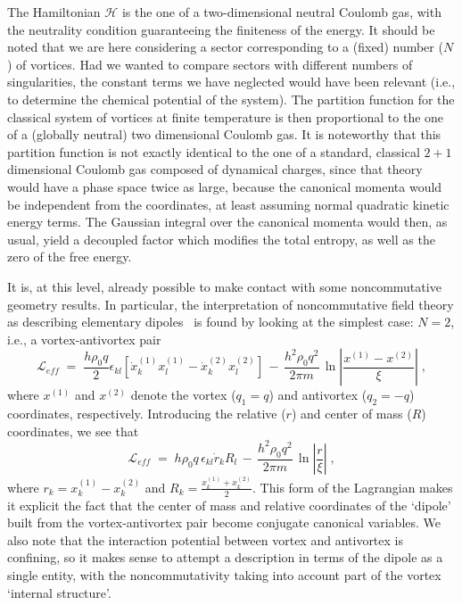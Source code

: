 \documentclass[a4paper,12pt]{article} \tolerance=200
\begin{document}
The Hamiltonian ${\mathcal H}$ is the one of a two-dimensional neutral
Coulomb gas, with the neutrality condition guaranteeing the finiteness
of the energy.  It should be noted that we are here considering a
sector corresponding to a (fixed) number ($N$) of vortices. Had we
wanted to compare sectors with different numbers of singularities, the
constant terms we have neglected would have been relevant (i.e., to
determine the chemical potential of the system). The partition
function for the classical system of vortices at finite temperature is
then proportional to the one of a (globally neutral) two dimensional
Coulomb gas. It is noteworthy that this partition function is not
exactly identical to the one of a standard, classical $2+1$
dimensional Coulomb gas composed of dynamical charges, since that
theory would have a phase space twice as large, because the canonical
momenta would be independent from the coordinates, at least assuming
normal quadratic kinetic energy terms. The Gaussian integral over the
canonical momenta would then, as usual, yield a decoupled factor which
modifies the total entropy, as well as the zero of the free energy.

It is, at this level, already possible to make contact with some
noncommutative geometry results. In particular, the interpretation of
noncommutative field theory as describing elementary dipoles~\cite{BS}
is found by looking at the simplest case: $N=2$, i.e., a 
vortex-antivortex pair
\begin{equation}\label{eq:fq2}
{\mathcal L}_{eff}\;=\; \frac{h \rho_0 q}{2} \epsilon_{kl}
[\dot{x}^{(1)}_k x^{(1)}_l - \dot{x}^{(2)}_k x^{(2)}_l]
\,-\,\frac{h^2\rho_0 q^2}{2\pi m}\, 
\ln | \frac{x^{(1)} - x^{(2)}}{\xi} | \;,
\end{equation}
where $x^{(1)}$ and $x^{(2)}$ denote the vortex ($q_1 = q$) and
antivortex ($q_2=-q$) coordinates, respectively. Introducing the
relative ($r$) and center of mass ($R$) coordinates, we see that
\begin{equation}
{\mathcal L}_{eff}\;=\; h \rho_0 q \, \epsilon_{kl} \dot{r}_k R_l
\,-\,\frac{h^2\rho_0 q^2}{2\pi m}\, \ln |\frac{r}{\xi}| \;,
\end{equation}
where $r_k=x^{(1)}_k - x^{(2)}_k$ and $R_k = \frac{x^{(1)}_k +
x^{(2)}_k}{2}$.  This form of the Lagrangian makes it explicit the
fact that the center of mass and relative coordinates of the `dipole'
built from the vortex-antivortex pair become conjugate canonical
variables. We also note that the interaction potential between vortex 
and antivortex is confining, so it makes sense to attempt a description
in terms of the dipole as a single entity, with the noncommutativity 
taking into account part of the vortex `internal structure'.
\end{document}
